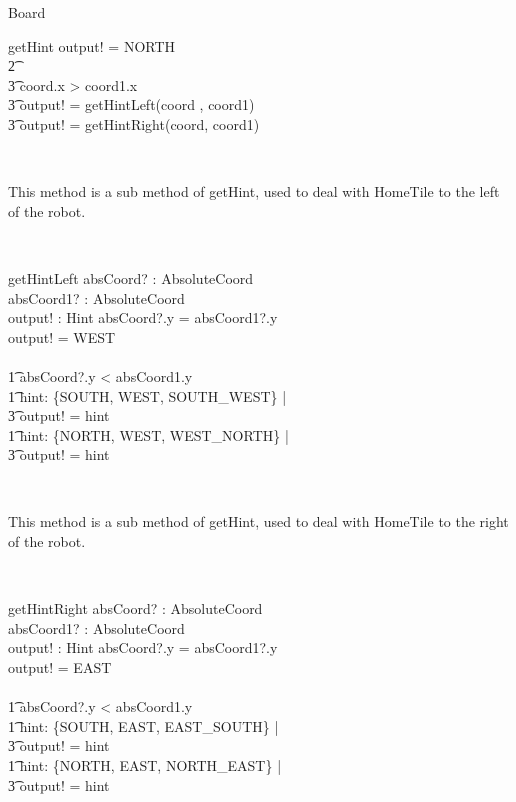\begin{class}{Board}
\begin{schema}{getHint}
\ELSE output! = NORTH \\ \t2
\ELSE \\ \t3
\IF coord.x > coord1.x \\ \t3
\THEN output! = getHintLeft(coord , coord1) \\ \t3
\ELSE output! = getHintRight(coord, coord1)
\end{schema} \\
\znewpage
\begin{classcom}
This method is a sub method of getHint, used to deal with HomeTile to the left of the robot.
\end{classcom} \\
\begin{schema}{getHintLeft}
absCoord? : AbsoluteCoord \\
absCoord1? : AbsoluteCoord \\
output! : Hint
\where
\IF absCoord?.y = absCoord1?.y \\
\THEN output! = WEST \\
\ELSE \\ \t1
\IF absCoord?.y < absCoord1.y \\ \t1
\THEN \exists hint: \{SOUTH, WEST, SOUTH\_WEST\} | \\ \t3 output! = hint \\ \t1
\ELSE \exists hint: \{NORTH, WEST, WEST\_NORTH\} | \\ \t3 output! = hint
\end{schema}\\
\begin{classcom}
This method is a sub method of getHint, used to deal with HomeTile to the right of the robot.
\end{classcom} \\
\begin{schema}{getHintRight}
absCoord? : AbsoluteCoord \\
absCoord1? : AbsoluteCoord \\
output! : Hint
\where
\IF absCoord?.y = absCoord1?.y \\
\THEN output! = EAST \\
\ELSE \\ \t1
\IF absCoord?.y < absCoord1.y \\ \t1
\THEN \exists hint: \{SOUTH, EAST, EAST\_SOUTH\} | \\ \t3 output! = hint \\ \t1
\ELSE \exists hint: \{NORTH, EAST, NORTH\_EAST\} | \\ \t3 output! = hint
\end{schema} \\

\end{class}
